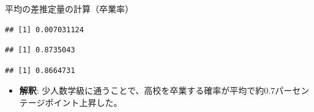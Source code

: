\documentclass[
  ignorenonframetext,
]{beamer}
\newenvironment{Shaded}{\begin{snugshade}}{\end{snugshade}}
\newcommand{\CommentTok}[1]{\textcolor[rgb]{0.56,0.35,0.01}{\textit{#1}}}
\newcommand{\DecValTok}[1]{\textcolor[rgb]{0.00,0.00,0.81}{#1}}
\newcommand{\FunctionTok}[1]{\textcolor[rgb]{0.00,0.00,0.00}{#1}}
\newcommand{\NormalTok}[1]{#1}
\newcommand{\SpecialCharTok}[1]{\textcolor[rgb]{0.00,0.00,0.00}{#1}}
\providecommand{\tightlist}{%
  \setlength{\itemsep}{0pt}\setlength{\parskip}{0pt}}
\begin{document}
\begin{frame}[fragile]{平均の差推定量の計算（卒業率）}
\protect\hypertarget{ux5e73ux5747ux306eux5deeux63a8ux5b9aux91cfux306eux8a08ux7b97ux5352ux696dux7387}{}
\scriptsize

\begin{Shaded}
\end{Shaded}

\begin{verbatim}
## [1] 0.007031124
\end{verbatim}

\begin{Shaded}
\end{Shaded}

\begin{verbatim}
## [1] 0.8735043
\end{verbatim}

\begin{Shaded}
\end{Shaded}

\begin{verbatim}
## [1] 0.8664731
\end{verbatim}

\normalsize

\begin{itemize}
\tightlist
\item
  \textbf{解釈}:
  少人数学級に通うことで、高校を卒業する確率が平均で約0.7パーセンテージポイント上昇した。
\end{itemize}
\end{frame}
\end{document}

